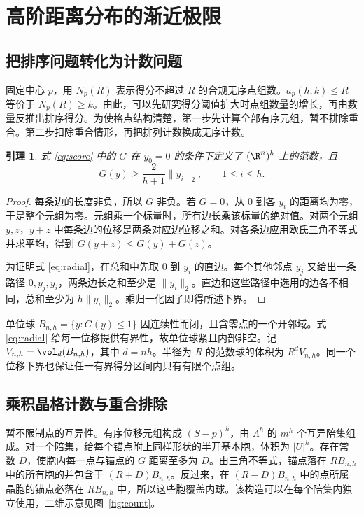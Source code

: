 \documentclass[11pt,a4paper,UTF8,fontset=fandol]{ctexart}
\newtheorem{lemma}{引理}
\theoremstyle{definition}
\begin{document}
\section{高阶距离分布的渐近极限}\label{sec:limit}

\subsection{把排序问题转化为计数问题}

固定中心 \(p\)，用 \(N_p(R)\) 表示得分不超过 \(R\) 的合规无序点组数。\(a_p(h,k)\le R\) 等价于 \(N_p(R)\ge k\)。由此，可以先研究得分阈值扩大时点组数量的增长，再由数量反推出排序得分。为使格点结构清楚，第一步先计算全部有序元组，暂不排除重合。第二步扣除重合情形，再把排列计数换成无序计数。

\begin{lemma}\label{lem:norm}
式 \eqref{eq:score} 中的 \(G\) 在 \(y_0=0\) 的条件下定义了 \((\R^n)^h\) 上的范数，且
\begin{equation}\label{eq:radial}
G(y)\ge\frac{2}{h+1}\|y_i\|_2,\qquad 1\le i\le h .
\end{equation}
\end{lemma}

\begin{proof}
每条边的长度非负，所以 \(G\) 非负。若 \(G=0\)，从 \(0\) 到各 \(y_i\) 的距离均为零，于是整个元组为零。元组乘一个标量时，所有边长乘该标量的绝对值。对两个元组 \(y,z\)，\(y+z\) 中每条边的位移是两条对应边位移之和。对各条边应用欧氏三角不等式并求平均，得到 \(G(y+z)\le G(y)+G(z)\)。

为证明式 \eqref{eq:radial}，在总和中先取 \(0\) 到 \(y_i\) 的直边。每个其他邻点 \(y_j\) 又给出一条路径 \(0,y_j,y_i\)，两条边长之和至少是 \(\|y_i\|_2\)。直边和这些路径中选用的边各不相同，总和至少为 \(h\|y_i\|_2\)。乘归一化因子即得所述下界。
\end{proof}

单位球 \(B_{n,h}=\{y:G(y)\le1\}\) 因连续性而闭，且含零点的一个开邻域。式 \eqref{eq:radial} 给每一位移提供有界性，故单位球紧且内部非空。记 \(V_{n,h}=\vol_d(B_{n,h})\)，其中 \(d=nh\)。半径为 \(R\) 的范数球的体积为 \(R^d V_{n,h}\)。同一个位移下界也保证任一有界得分区间内只有有限个点组。

\subsection{乘积晶格计数与重合排除}

暂不限制点的互异性。有序位移元组构成 \((S-p)^h\)，由 \(\Lambda^h\) 的 \(m^h\) 个互异陪集组成。对一个陪集，给每个锚点附上同样形状的半开基本胞，体积为 \(|U|^h\)。存在常数 \(D\)，使胞内每一点与锚点的 \(G\) 距离至多为 \(D\)。由三角不等式，锚点落在 \(RB_{n,h}\) 中的所有胞的并包含于 \((R+D)B_{n,h}\)。反过来，在 \((R-D)B_{n,h}\) 中的点所属晶胞的锚点必落在 \(RB_{n,h}\) 中，所以这些胞覆盖内球。该构造可以在每个陪集内独立使用，二维示意见图~\ref{fig:count}。
\end{document}
